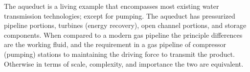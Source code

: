 \documentclass[12pt]{article}
\begin{document}
The aqueduct is a living example that encompasses most existing water transmission technologies; except for pumping.  The aqueduct has pressurized pipeline portions, turbines (energy recovery), open channel portions, and storage components.   When compared to a modern gas pipeline the principle differences are the working fluid, and the requirement in a gas pipeline of compressor (pumping) stations to maintaining the driving force to transmit the product.  Otherwise in terms of scale, complexity, and importance the two are equivalent.
\end{document}
